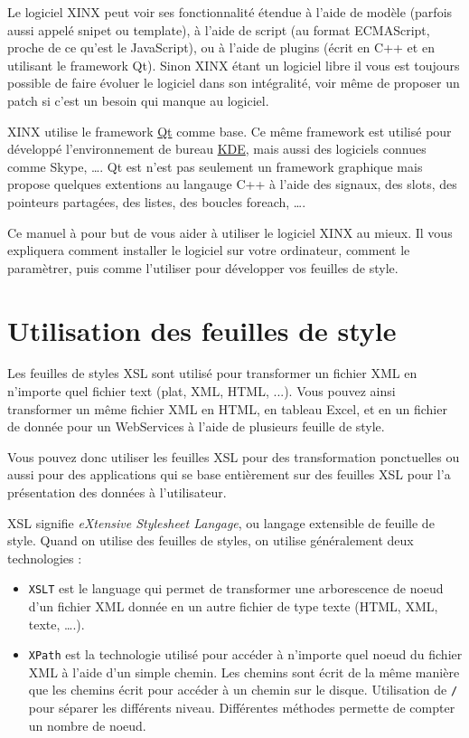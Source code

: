 \documentclass[a4paper,10pt,twoside]{book}
\begin{document}
Le logiciel XINX peut voir ses fonctionnalité étendue à l'aide de modèle (parfois aussi appelé snipet ou template), à l'aide de script (au format ECMAScript, proche de ce qu'est le JavaScript), ou à l'aide de plugins (écrit en C++ et en utilisant le framework Qt). Sinon XINX étant un logiciel libre il vous est toujours possible de faire évoluer le logiciel dans son intégralité, voir même de proposer un patch si c'est un besoin qui manque au logiciel.

XINX utilise le framework \href{http://qt.nokia.com}{Qt} comme base. Ce même framework est utilisé pour développé l'environnement de bureau \href{htpp://ww.kde.org}{KDE}, mais aussi des logiciels connues comme Skype, \ldots. Qt est n'est pas seulement un framework graphique mais propose quelques extentions au langauge C++ à l'aide des signaux, des slots, des pointeurs partagées, des listes, des boucles foreach, \ldots.

Ce manuel à pour but de vous aider à utiliser le logiciel XINX au mieux. Il vous expliquera comment installer le logiciel sur votre ordinateur, comment le paramètrer, puis comme l'utiliser pour développer vos feuilles de style.

\section{Utilisation des feuilles de style}

Les feuilles de styles XSL sont utilisé pour transformer un fichier XML en n'importe quel fichier text (plat, XML, HTML, ...). Vous pouvez ainsi transformer un même fichier XML en HTML, en tableau Excel, et en un fichier de donnée pour un WebServices à l'aide de plusieurs feuille de style.

Vous pouvez donc utiliser les feuilles XSL pour des transformation ponctuelles ou aussi pour des applications qui se base entièrement sur des feuilles XSL pour l'a présentation des données à l'utilisateur.

XSL signifie \emph{eXtensive Stylesheet Langage}, ou langage extensible de feuille de style. Quand on utilise des feuilles de styles, on utilise généralement deux technologies : 

\begin{itemize}
 \item \verb+XSLT+ est le language qui permet de transformer une arborescence de noeud d'un fichier XML donnée en un autre fichier de type texte (HTML, XML, texte, \dots.).
 \item \verb+XPath+ est la technologie utilisé pour accéder à n'importe quel noeud du fichier XML à l'aide d'un simple chemin. Les chemins sont écrit de la même manière que les chemins écrit pour accéder à un chemin sur le disque. Utilisation de \verb+/+ pour séparer les différents niveau. Différentes méthodes permette de compter un nombre de noeud.
\end{itemize}
\end{document}
